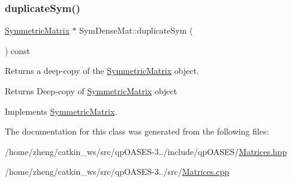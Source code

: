 \subsubsection{\texorpdfstring{duplicate\+Sym()}{duplicateSym()}}
{\footnotesize\ttfamily \hyperlink{class_symmetric_matrix}{Symmetric\+Matrix} $\ast$ Sym\+Dense\+Mat\+::duplicate\+Sym (\begin{DoxyParamCaption}{ }\end{DoxyParamCaption}) const\hspace{0.3cm}{\ttfamily [virtual]}}

Returns a deep-\/copy of the \hyperlink{class_symmetric_matrix}{Symmetric\+Matrix} object. \begin{DoxyReturn}{Returns}
Deep-\/copy of \hyperlink{class_symmetric_matrix}{Symmetric\+Matrix} object 
\end{DoxyReturn}


Implements \hyperlink{class_symmetric_matrix_a4dacd5fe6d12b5082a90a7336669fce7}{Symmetric\+Matrix}.



The documentation for this class was generated from the following files\+:\begin{DoxyCompactItemize}
\item 
/home/zheng/catkin\+\_\+ws/src/qp\+O\+A\+S\+E\+S-\/3../include/qp\+O\+A\+S\+E\+S/\hyperlink{_matrices_8hpp}{Matrices.\+hpp}\item 
/home/zheng/catkin\+\_\+ws/src/qp\+O\+A\+S\+E\+S-\/3../src/\hyperlink{_matrices_8cpp}{Matrices.\+cpp}\end{DoxyCompactItemize}
